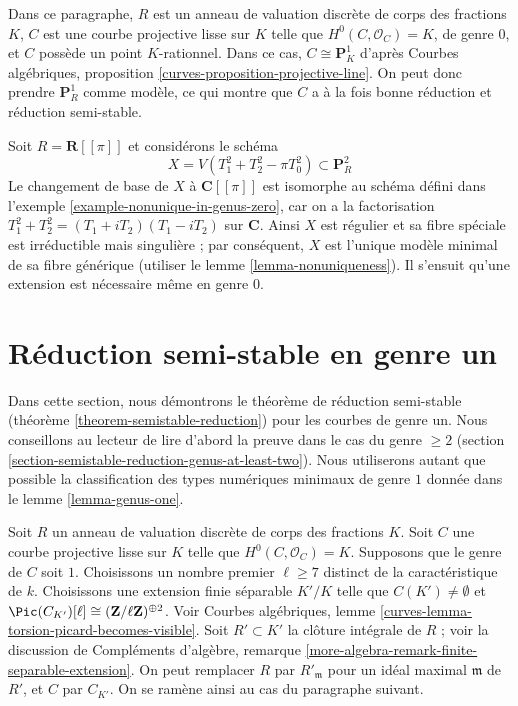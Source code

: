 \medskip\noindent
Dans ce paragraphe, $R$ est un anneau de valuation discrète de corps des
fractions $K$, $C$ est une courbe projective lisse sur $K$ telle que
$H^0(C,\mathcal{O}_C)=K$, de genre $0$, et $C$ possède un point
$K$-rationnel. Dans ce cas, $C\cong\mathbf{P}^1_K$ d'après Courbes
algébriques, proposition \ref{curves-proposition-projective-line}. On peut
donc prendre $\mathbf{P}^1_R$ comme modèle, ce qui montre que $C$ a à la
fois bonne réduction et réduction semi-stable.

\begin{example}
\label{example-extension-necessary-genus-zero}
Soit $R=\mathbf{R}[[\pi]]$ et considérons le schéma
$$
X = V(T_1^2 + T_2^2 - \pi T_0^2) \subset \mathbf{P}^2_R
$$
Le changement de base de $X$ à $\mathbf{C}[[\pi]]$ est isomorphe au schéma
défini dans l'exemple \ref{example-nonunique-in-genus-zero}, car on a la
factorisation $T_1^2+T_2^2=(T_1+iT_2)(T_1-iT_2)$ sur $\mathbf{C}$.
Ainsi $X$ est régulier et sa fibre spéciale est irréductible mais
singulière ; par conséquent, $X$ est l'unique modèle minimal de sa fibre
générique (utiliser le lemme \ref{lemma-nonuniqueness}). Il s'ensuit qu'une
extension est nécessaire même en genre $0$.
\end{example}



\section{Réduction semi-stable en genre un}
\label{section-semistable-reduction-genus-one}

\noindent
Dans cette section, nous démontrons le théorème de réduction semi-stable
(théorème \ref{theorem-semistable-reduction}) pour les courbes de genre un.
Nous conseillons au lecteur de lire d'abord la preuve dans le cas du genre
$\geq2$ (section \ref{section-semistable-reduction-genus-at-least-two}).
Nous utiliserons autant que possible la classification des types numériques
minimaux de genre $1$ donnée dans le lemme \ref{lemma-genus-one}.

\medskip\noindent
Soit $R$ un anneau de valuation discrète de corps des fractions $K$.
Soit $C$ une courbe projective lisse sur $K$ telle que
$H^0(C,\mathcal{O}_C)=K$. Supposons que le genre de $C$ soit $1$.
Choisissons un nombre premier $\ell\geq7$ distinct de la caractéristique
de $k$. Choisissons une extension finie séparable $K'/K$ telle que
$C(K') \not = \emptyset$ et
$\Pic(C_{K'})[\ell]\cong(\mathbf{Z}/\ell\mathbf{Z})^{\oplus2}$.
Voir Courbes algébriques, lemme
\ref{curves-lemma-torsion-picard-becomes-visible}. Soit $R'\subset K'$ la
clôture intégrale de $R$ ; voir la discussion de Compléments d'algèbre,
remarque \ref{more-algebra-remark-finite-separable-extension}. On peut
remplacer $R$ par $R'_{\mathfrak m}$ pour un idéal maximal $\mathfrak m$
de $R'$, et $C$ par $C_{K'}$. On se ramène ainsi au cas du paragraphe
suivant.

